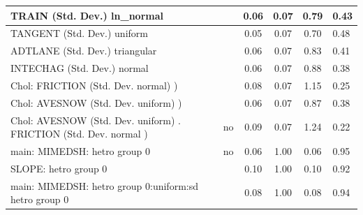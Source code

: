 \begin{table}
\begin{center}
\begin{tabular}{|l|l|c|c|c|l|}
			\hline
			TRAIN (Std. Dev.) ln_normal &  & 0.06 & 0.07 & 0.79 & 0.43 \\
			\hline
			TANGENT (Std. Dev.) uniform &  & 0.05 & 0.07 & 0.70 & 0.48 \\
			\hline
			ADTLANE (Std. Dev.) triangular &  & 0.06 & 0.07 & 0.83 & 0.41 \\
			\hline
			INTECHAG (Std. Dev.) normal &  & 0.06 & 0.07 & 0.88 & 0.38 \\
			\hline
			 Chol: FRICTION (Std. Dev. normal) ) &  & 0.08 & 0.07 & 1.15 & 0.25 \\
			\hline
			 Chol: AVESNOW (Std. Dev. uniform) ) &  & 0.06 & 0.07 & 0.87 & 0.38 \\
			\hline
			 Chol: AVESNOW (Std. Dev. uniform) . FRICTION (Std. Dev.   normal ) & no & 0.09 & 0.07 & 1.24 & 0.22 \\
			\hline
			main: MIMEDSH: hetro group 0 & no & 0.06 & 1.00 & 0.06 & 0.95 \\
			\hline
			SLOPE: hetro group 0 &  & 0.10 & 1.00 & 0.10 & 0.92 \\
			\hline
			main: MIMEDSH: hetro group 0:uniform:sd  hetro group 0 &  & 0.08 & 1.00 & 0.08 & 0.94 \\
			\hline
		\end{tabular}
	\end{center}
\end{table}